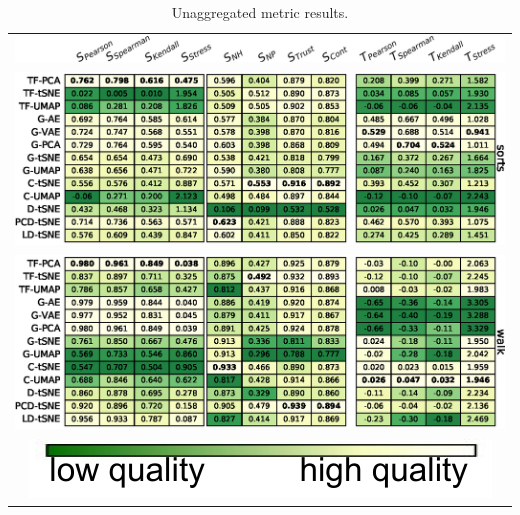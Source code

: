 \begin{table}[h]
\begin{tabular}{c}
  \vspace{-.1cm}
  \includegraphics[width=\linewidth]{figures/projection-algorithm/table_header.png} \\
  \includegraphics[width=\linewidth]{figures/projection-algorithm/table_sorts.eps} \\
  \includegraphics[width=\linewidth]{figures/projection-algorithm/table_walk.eps} \\
  \includegraphics[width=.35\linewidth]{figures/projection-algorithm/green-colormap.pdf} \\
\end{tabular}
\caption{Unaggregated metric results.}
\label{tab:unaggregated}
\end{table}








